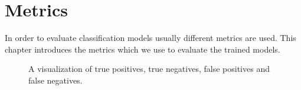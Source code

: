 \section{Metrics}
\label{chp:fundamentals:sec:metrics}

In order to evaluate classification models usually different metrics are used.
This chapter introduces the metrics which we use to evaluate the trained models.

\begin{figure}[htpb]
    \centering
    \def\svgwidth{\columnwidth}
    
    \caption[Visualization of True Positives]{A visualization of true positives, true negatives, false positives and false negatives.}\label{fig:metrics:tp_vis}
\end{figure}





